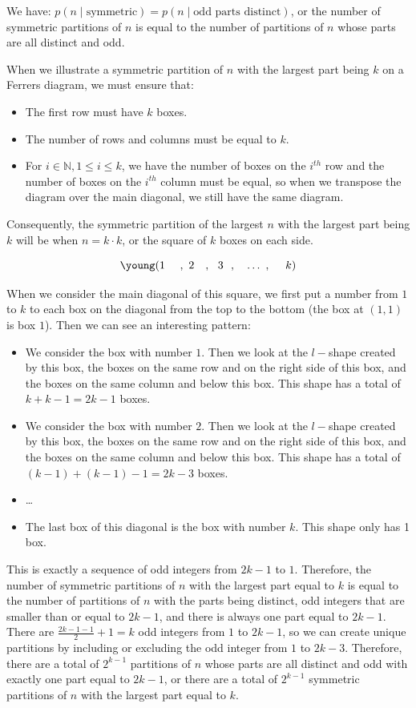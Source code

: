 \documentclass[10pt]{article}
\begin{document}
\begin{enumerate}
\begin{enumerate}
We have: $p(n \mid \text{symmetric})=p(n \mid \text{odd parts distinct})$, or the number of symmetric partitions of $n$ is equal to the number of partitions of $n$ whose parts are all distinct and odd. 

When we illustrate a symmetric partition of $n$ with the largest part being $k$ on a Ferrers diagram, we must ensure that:

\begin{itemize}
    \item The first row must have $k$ boxes.
    \item The number of rows and columns must be equal to $k$.
    \item For $i \in \mathbb{N}, 1 \leq i \leq k$, we have the number of boxes on the $i^{th}$ row and the number of boxes on the $i^{th}$ column must be equal, so when we transpose the diagram over the main diagonal, we still have the same diagram.
\end{itemize}

Consequently, the symmetric partition of the largest $n$ with the largest part being $k$ will be when $n = k \cdot k$, or the square of $k$ boxes on each side. 

$$\young(1~~~~,~2~~~,~~3~~,~~~\ldots~,~~~~k)$$

When we consider the main diagonal of this square, we first put a number from $1$ to $k$ to each box on the diagonal from the top to the bottom (the box at $(1,1)$ is box $1$). Then we can see an interesting pattern: 

\begin{itemize}
    \item We consider the box with number $1$. Then we look at the $l-$shape created by this box, the boxes on the same row and on the right side of this box, and the boxes on the same column and below this box. This shape has a total of $k + k -1=2k-1$ boxes.
    \item We consider the box with number $2$. Then we look at the $l-$shape created by this box, the boxes on the same row and on the right side of this box, and the boxes on the same column and below this box. This shape has a total of $(k-1) + (k-1) -1=2k-3$ boxes.
    \item \ldots
    \item The last box of this diagonal is the box with number $k$. This shape only has 1 box.
\end{itemize}

    This is exactly a sequence of odd integers from $2k-1$ to $1$. Therefore, the number of symmetric partitions of $n$ with the largest part equal to $k$ is equal to the number of partitions of $n$ with the parts being distinct, odd integers that are smaller than or equal to $2k - 1$, and there is always one part equal to $2k-1$. There are $\frac{2k-1-1}{2} + 1 = k$ odd integers from $1$ to $2k-1$, so we can create unique partitions by including or excluding the odd integer from $1$ to $2k-3$. Therefore, there are a total of $2^{k-1}$ partitions of $n$ whose parts are all distinct and odd with exactly one part equal to $2k-1$, or there are a total of $2^{k-1}$ symmetric partitions of $n$ with the largest part equal to $k$.


\end{enumerate}
\end{enumerate}
\end{document}
